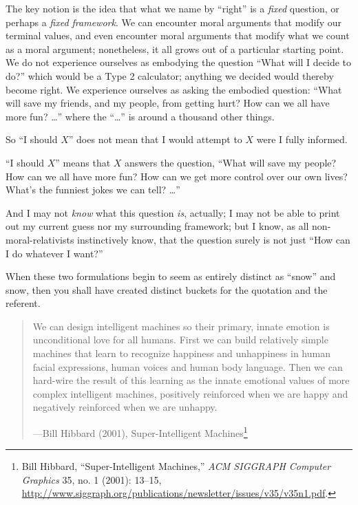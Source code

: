 {
 The key notion is the idea that what we name by
``right'' is a \textit{fixed}
question, or perhaps a \textit{fixed framework}. We can encounter moral
arguments that modify our terminal values, and even encounter moral
arguments that modify what we count as a moral argument; nonetheless,
it all grows out of a particular starting point. We do not experience
ourselves as embodying the question ``What will I
decide to do?'' which would be a Type 2 calculator;
anything we decided would thereby become right. We experience ourselves
as asking the embodied question: ``What will save my
friends, and my people, from getting hurt? How can we all have more
fun? \ldots'' where the
``\ldots'' is around a thousand other
things.}

{
 So ``I should $X$'' does not mean
that I would attempt to $X$ were I fully informed.}

{
 ``I should $X$'' means that $X$
answers the question, ``What will save my people? How
can we all have more fun? How can we get more control over our own
lives? What's the funniest jokes we can tell?
\ldots''}

{
 And I may not \textit{know} what this question \textit{is},
actually; I may not be able to print out my current guess nor my
surrounding framework; but I know, as all non-moral-relativists
instinctively know, that the question surely is not just
``How can I do whatever I want?''}

{
 When these two formulations begin to seem as entirely distinct as
``snow'' and snow, then you shall
have created distinct buckets for the quotation and the referent.}

\myendsectiontext


\begin{quote}
{
 We can design intelligent machines so their primary, innate
emotion is unconditional love for all humans. First we can build
relatively simple machines that learn to recognize happiness and
unhappiness in human facial expressions, human voices and human body
language. Then we can hard-wire the result of this learning as the
innate emotional values of more complex intelligent machines,
positively reinforced when we are happy and negatively reinforced when
we are unhappy.}

{\raggedleft
 {}---Bill Hibbard (2001), Super-Intelligent
Machines\footnote{Bill Hibbard, ``Super-Intelligent
Machines,'' \textit{ACM SIGGRAPH Computer Graphics}
35, no. 1 (2001): 13--15,
\url{http://www.siggraph.org/publications/newsletter/issues/v35/v35n1.pdf}.}
\par}
\end{quote}


